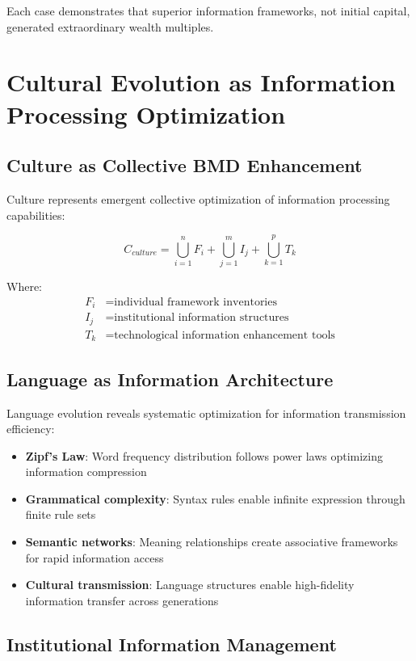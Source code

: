 \documentclass[12pt,a4paper]{article}
\begin{document}
Each case demonstrates that superior information frameworks, not initial capital, generated extraordinary wealth multiples.

\section{Cultural Evolution as Information Processing Optimization}

\subsection{Culture as Collective BMD Enhancement}

Culture represents emergent collective optimization of information processing capabilities:

\begin{equation}
C_{culture} = \bigcup_{i=1}^{n} F_i + \bigcup_{j=1}^{m} I_j + \bigcup_{k=1}^{p} T_k
\end{equation}

Where:
\begin{align}
F_i &= \text{individual framework inventories} \\
I_j &= \text{institutional information structures} \\  
T_k &= \text{technological information enhancement tools}
\end{align}

\subsection{Language as Information Architecture}

Language evolution reveals systematic optimization for information transmission efficiency:

\begin{itemize}
\item \textbf{Zipf's Law}: Word frequency distribution follows power laws optimizing information compression
\item \textbf{Grammatical complexity}: Syntax rules enable infinite expression through finite rule sets
\item \textbf{Semantic networks}: Meaning relationships create associative frameworks for rapid information access
\item \textbf{Cultural transmission}: Language structures enable high-fidelity information transfer across generations
\end{itemize}

\subsection{Institutional Information Management}
\end{document}
